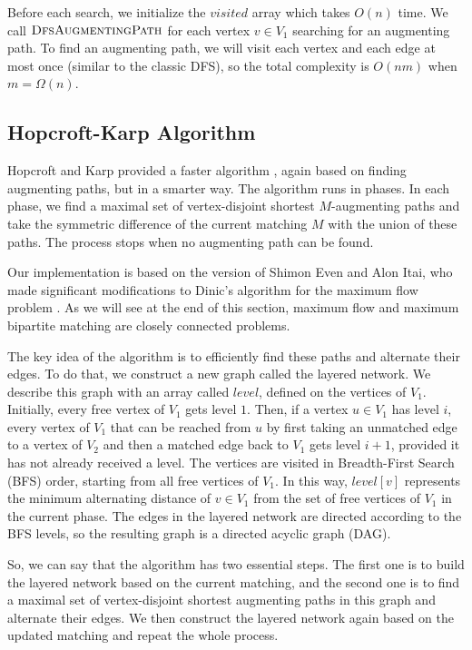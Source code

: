 \documentclass[12pt]{report}
\numberwithin{algorithm}{chapter}
\begin{document}
	Before each search, we initialize the $\mathit{visited}$ array which takes $O(n)$ time. We call $\Call{DfsAugmentingPath}{}$ for each vertex $v \in V_{1}$ searching for an augmenting path. To find an augmenting path, we will visit each vertex and each edge at most once (similar to the classic DFS), so the total complexity is $O(nm)$ when $m = \Omega(n)$.

	\newpage 
	\subsection{Hopcroft-Karp Algorithm} Hopcroft and Karp provided a faster algorithm \cite{hopcroft1973n}, again based on finding augmenting paths, but in a smarter way. The algorithm runs in phases. In each phase, we find a maximal set of vertex-disjoint shortest $M$-augmenting paths and take the symmetric difference of the current matching $M$ with the union of these paths. The process stops when no augmenting path can be found. 

	Our implementation is based on the version of Shimon Even and Alon Itai, who made significant modifications to Dinic's algorithm for the maximum flow problem \cite{dinitz1970,dinitz2006}. As we will see at the end of this section, maximum flow and maximum bipartite matching are closely connected problems.

	The key idea of the algorithm is to efficiently find these paths and alternate their edges. To do that, we construct a new graph called the layered network. We describe this graph with an array called $\mathit{level}$, defined on the vertices of $V_{1}$. Initially, every free vertex of $V_{1}$ gets level $1$. Then, if a vertex $u \in V_{1}$ has level $i$, every vertex of $V_{1}$ that can be reached from $u$ by first taking an unmatched edge to a vertex of $V_{2}$ and then a matched edge back to  $V_{1}$ gets level $i+1$, provided it has not already received a level. The vertices are visited in Breadth-First Search (BFS) order, starting from all free vertices of $V_{1}$. In this way, $\mathit{level}[v]$ represents the minimum alternating distance of $v \in V_{1}$ from the set of free vertices of $V_{1}$ in the current phase. The edges in the layered network are directed according to the BFS levels, so the resulting graph is a directed acyclic graph (DAG).
	
	So, we can say that the algorithm has two essential steps. The first one is to build the layered network based on the current matching, and the second one is to find a maximal set of vertex-disjoint shortest augmenting paths in this graph and alternate their edges. We then construct the layered network again based on the updated matching and repeat the whole process.
\end{document}
